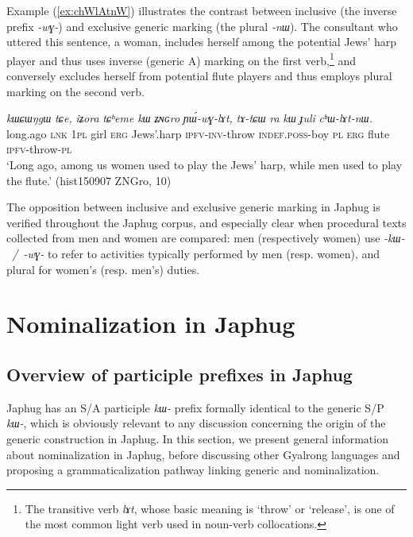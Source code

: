 \documentclass[oneside,a4paper,11pt]{article}
\newcommand{\ipa}[1]{\textit{\phon\mbox{#1}}} %
\newcommand{\refb}[1]{(\ref{#1})}
\begin{document}
Example \refb{ex:chWlAtnW} illustrates the contrast between inclusive (the inverse prefix \ipa{-wɣ-}) and exclusive generic marking (the plural \ipa{-nɯ}). The consultant who uttered this sentence, a woman, includes herself among the potential Jews' harp player and thus uses inverse (generic A) marking on the first verb,\footnote{The transitive verb \ipa{lɤt}, whose basic meaning is `throw' or `release', is one of the most common light verb used in noun-verb collocations.} and conversely excludes herself from potential flute players and thus employs plural marking on the second verb. 

\begin{exe}
\ex \label{ex:chWlAtnW}
 \gll  \ipa{kɯɕɯŋgɯ} 	\ipa{tɕe,} 	\ipa{iʑora} 	\ipa{tɕʰeme} 	\ipa{kɯ} 	\ipa{ʑɴɢro} 	\ipa{ɲɯ́-wɣ-lɤt,} 	\ipa{tɤ-tɕɯ} 	\ipa{ra} 	\ipa{kɯ} 	\ipa{ɟuli} 	\ipa{cʰɯ-lɤt-nɯ.} \\
 long.ago \textsc{lnk} \textsc{1pl} girl  \textsc{erg} Jews'.harp \textsc{ipfv-inv}-throw \textsc{indef.poss}-boy \textsc{pl} \textsc{erg} flute \textsc{ipfv}-throw-\textsc{pl}  \\
 \glt `Long ago, among us women used to play the Jews' harp, while men used to play the flute.' (hist150907 ZNGro, 10)
\end{exe}
 
The opposition between inclusive and exclusive generic marking in Japhug is verified throughout the Japhug corpus, and especially clear when procedural texts collected from men and women are compared: men (respectively women) use  \ipa{-kɯ- / -wɣ-} to refer to activities typically performed by men (resp. women), and plural for women's (resp. men's) duties.

 \section{Nominalization in Japhug} \label{sec:nmlz}
 \subsection{Overview of participle prefixes in Japhug}
Japhug has an S/A participle \ipa{kɯ-} prefix formally identical to the generic S/P \ipa{kɯ-}, which is obviously relevant to any discussion concerning the origin of the generic construction in Japhug. In this section, we present general information about nominalization in Japhug, before discussing other Gyalrong languages and proposing a grammaticalization pathway linking generic and nominalization. 
\end{document}
